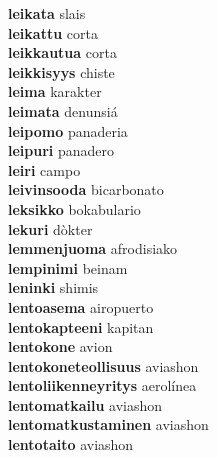 \textbf{leikata } slais \\
\textbf{leikattu } corta \\
\textbf{leikkautua } corta \\
\textbf{leikkisyys } chiste \\
\textbf{leima } karakter \\
\textbf{leimata } denunsiá \\
\textbf{leipomo } panaderia \\
\textbf{leipuri } panadero \\
\textbf{leiri } campo \\
\textbf{leivinsooda } bicarbonato \\
\textbf{leksikko } bokabulario \\
\textbf{lekuri } dòkter \\
\textbf{lemmenjuoma } afrodisiako \\
\textbf{lempinimi } beinam \\
\textbf{leninki } shimis \\
\textbf{lentoasema } airopuerto \\
\textbf{lentokapteeni } kapitan \\
\textbf{lentokone } avion \\
\textbf{lentokoneteollisuus } aviashon \\
\textbf{lentoliikenneyritys } aerolínea \\
\textbf{lentomatkailu } aviashon \\
\textbf{lentomatkustaminen } aviashon \\
\textbf{lentotaito } aviashon \\
